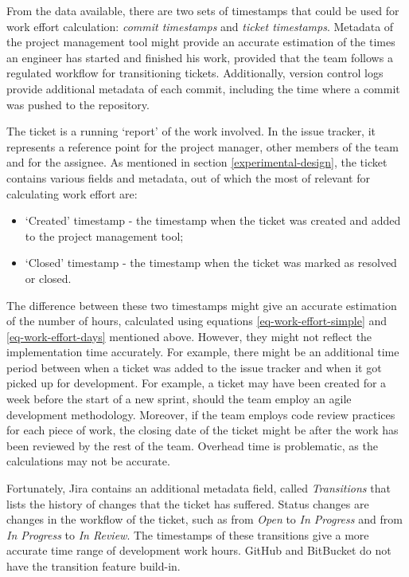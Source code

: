 \documentclass{mpaper}
\begin{document}
From the data available, there are two sets of timestamps that could be used for
work effort calculation: \emph{commit timestamps} and \emph{ticket timestamps}.
Metadata of the project management tool might provide an accurate estimation of
the times an engineer has started and finished his work, provided that the team
follows a regulated workflow for transitioning tickets. Additionally, version
control logs provide additional metadata of each commit, including the time
where a commit was pushed to the repository. 

The ticket is a running `report' of the work involved. In the issue tracker, it
represents a reference point for the project manager, other members of the team
and for the assignee. As mentioned in section \ref{experimental-design}, the
ticket contains various fields and metadata, out of which the most of relevant
for calculating work effort are:

\begin{itemize}
  \item `Created' timestamp - the timestamp when the ticket was created and
  added to the project management tool;
  \item `Closed' timestamp - the timestamp when the ticket was marked as
  resolved or closed.  
\end{itemize}

The difference between these two timestamps might give an accurate estimation of
the number of hours, calculated using equations \ref{eq-work-effort-simple} and
\ref{eq-work-effort-days} mentioned above. However, they might not reflect the
implementation time accurately. For example, there might be an additional time
period between when a ticket was added to the issue tracker and when it got
picked up for development. For example, a ticket may have been created for a
week before the start of a new sprint, should the team employ an agile
development methodology. Moreover, if the team employs code review practices for
each piece of work, the closing date of the ticket might be after the work has
been reviewed by the rest of the team. Overhead time is problematic, as the
calculations may not be accurate. 

Fortunately, Jira contains an additional metadata field, called
\emph{Transitions} that lists the history of changes that the ticket has
suffered. Status changes are changes in the workflow of the ticket, such as from
\emph{Open} to \emph{In Progress} and from \emph{In Progress} to \emph{In
Review}. The timestamps of these transitions give a more accurate time range of
development work hours. GitHub and BitBucket do not have the transition feature
build-in.
\end{document}
